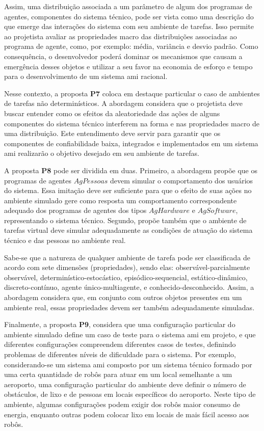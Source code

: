     Assim, uma distribuição associada a um parâmetro de algum dos programas de agentes, componentes do sistema técnico, pode ser vista como uma descrição do que emerge das interações do sistema com seu ambiente de tarefas. Isso permite ao projetista avaliar as propriedades macro das distribuições associadas ao programa de agente, como, por exemplo: média, variância e desvio padrão. Como consequência, o desenvolvedor poderá dominar os mecanismos que causam a emergência desses objetos e utilizar a seu favor na economia de esforço e tempo para o desenvolvimento de um sistema \acrshort{ami} racional. 
    
    Nesse contexto, a proposta \textbf{P7} coloca em destaque particular o caso de ambientes de tarefas não determinísticos. A abordagem considera que o projetista deve buscar entender como os efeitos da aleatoriedade das ações de alguns componentes do sistema técnico interferem na forma e nas propriedades macro de uma distribuição. Este entendimento deve servir para garantir que os componentes de confiabilidade baixa, integrados e implementados em um sistema \acrshort{ami} realizarão o objetivo desejado em seu ambiente de tarefas.
    
    A proposta \textbf{P8} pode ser dividida em duas. Primeiro, a abordagem propõe que os programas de agentes $AgPessoas$ devem simular o comportamento dos usuários do sistema. Essa imitação deve ser suficiente para que o efeito de suas ações no ambiente simulado gere como resposta um comportamento correspondente adequado dos programas de agentes dos tipos $AgHardware$ e $AgSoftware$, representando o sistema técnico. Segundo, propõe também que o ambiente de tarefas virtual deve simular adequadamente as condições de atuação do sistema técnico e das pessoas no ambiente real. 
    
    Sabe-se que a natureza de qualquer ambiente de tarefa pode ser classificada de acordo com sete dimensões (propriedades), sendo elas: observável-parcialmente observável, determinístico-estocástico, episódico-sequencial, estático-dinâmico, discreto-contínuo, agente único-multiagente, e conhecido-desconhecido. Assim, a abordagem considera que, em conjunto com outros objetos presentes em um ambiente real, essas propriedades devem ser também adequadamente simuladas. 
    
    Finalmente, a proposta \textbf{P9}, considera que uma configuração particular do ambiente simulado define um caso de teste para o sistema \acrshort{ami} em projeto, e que diferentes configurações compreendem diferentes casos de testes, definindo problemas de diferentes níveis de dificuldade para o sistema. Por exemplo, considerando-se um sistema \acrshort{ami} composto por um sistema técnico formado por uma certa quantidade de robôs para atuar em um local semelhante a um aeroporto, uma configuração particular do ambiente deve definir o número de obstáculos, de lixo e de pessoas em locais específicos do aeroporto. Neste tipo de ambiente, algumas configurações podem exigir dos robôs maior consumo de energia, enquanto outras podem colocar lixo em locais de mais fácil acesso aos robôs.
    
